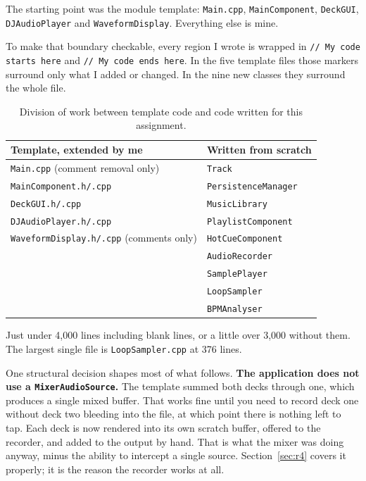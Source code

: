 \documentclass[11pt,a4paper]{article}
\newcommand{\code}[1]{\texttt{#1}}
\begin{document}
The starting point was the module template: \code{Main.cpp},
\code{MainComponent}, \code{DeckGUI}, \code{DJAudioPlayer} and
\code{WaveformDisplay}. Everything else is mine.

To make that boundary checkable, every region I wrote is wrapped in \code{// My
code starts here} and \code{// My code ends here}. In the five template files
those markers surround only what I added or changed. In the nine new classes they
surround the whole file.

\begin{table}[H]
\centering
\small
\begin{tabular}{ll}
\toprule
\textbf{Template, extended by me} & \textbf{Written from scratch} \\
\midrule
\code{Main.cpp} (comment removal only)            & \code{Track} \\
\code{MainComponent.h/.cpp}                       & \code{PersistenceManager} \\
\code{DeckGUI.h/.cpp}                             & \code{MusicLibrary} \\
\code{DJAudioPlayer.h/.cpp}                       & \code{PlaylistComponent} \\
\code{WaveformDisplay.h/.cpp} (comments only)     & \code{HotCueComponent} \\
                                                  & \code{AudioRecorder} \\
                                                  & \code{SamplePlayer} \\
                                                  & \code{LoopSampler} \\
                                                  & \code{BPMAnalyser} \\
\bottomrule
\end{tabular}
\caption{Division of work between template code and code written for this assignment.}
\end{table}

Just under 4{,}000 lines including blank lines, or a little over 3{,}000 without
them. The largest single file is \code{LoopSampler.cpp} at 376 lines.

One structural decision shapes most of what follows. \textbf{The application does
not use a \code{MixerAudioSource}.} The template summed both decks through one,
which produces a single mixed buffer. That works fine until you need to record
deck one without deck two bleeding into the file, at which point there is nothing
left to tap. Each deck is now rendered into its own scratch buffer, offered to
the recorder, and added to the output by hand. That is what the mixer was doing
anyway, minus the ability to intercept a single source.
Section~\ref{sec:r4} covers it properly; it is the reason the recorder works at
all.
\end{document}
